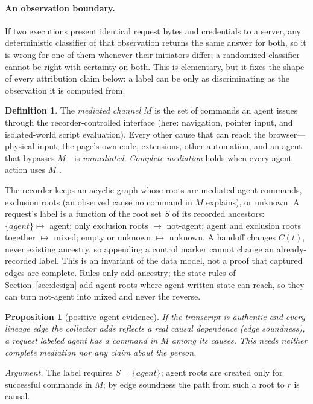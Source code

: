 \documentclass[11pt]{article}
\newtheorem{proposition}{Proposition}
\theoremstyle{definition}
\newtheorem{definition}{Definition}
\begin{document}
\paragraph{An observation boundary.} If two executions present identical request
bytes and credentials to a server, any deterministic classifier of that
observation returns the same answer for both, so it is wrong for one of them
whenever their initiators differ; a randomized classifier cannot be right with
certainty on both. This is elementary, but it fixes the shape of every
attribution claim below: a label can be only as discriminating as the observation
it is computed from.

\begin{definition}
The \emph{mediated channel} $M$ is the set of commands an agent issues through the
recorder-controlled interface (here: navigation, pointer input, and isolated-world
script evaluation). Every other cause that can reach the browser---physical input,
the page's own code, extensions, other automation, and an agent that bypasses
$M$---is \emph{unmediated}. \emph{Complete mediation} holds when every agent action
uses $M$ \cite{saltzer1975}.
\end{definition}

The recorder keeps an acyclic graph whose roots are mediated agent commands,
exclusion roots (an observed cause no command in $M$ explains), or unknown.
A request's label is a function of the root set $S$ of its recorded ancestors:
$\{\textit{agent}\}\mapsto$ agent; only exclusion roots $\mapsto$ not-agent; agent
and exclusion roots together $\mapsto$ mixed; empty or unknown $\mapsto$ unknown. A
handoff changes $C(t)$, never existing ancestry, so appending a control marker
cannot change an already-recorded label. This is an invariant of the data model,
not a proof that captured edges are complete. Rules only add ancestry; the state
rules of Section~\ref{sec:design} add agent roots where agent-written state can
reach, so they can turn not-agent into mixed and never the reverse.

\begin{proposition}[positive agent evidence]\label{prop:agent}
If the transcript is authentic and every lineage edge the collector adds reflects
a real causal dependence (edge soundness), a request labeled agent has a command
in $M$ among its causes. This needs neither complete mediation nor any claim about
the person.
\end{proposition}
\noindent\emph{Argument.} The label requires $S=\{\textit{agent}\}$; agent roots are
created only for successful commands in $M$; by edge soundness the path from such
a root to $r$ is causal. \hfill\qedsymbol
\end{document}
